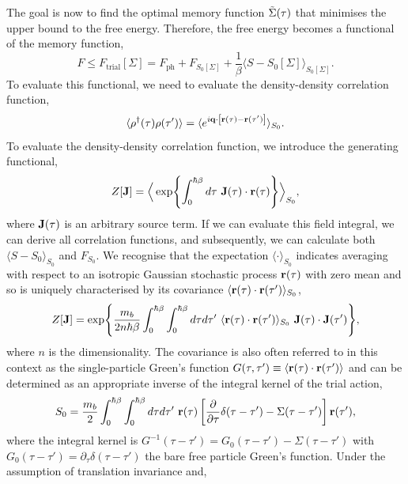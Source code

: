 The goal is now to find the optimal memory function $\Tilde{\Sigma}(\tau)$ that minimises the upper bound to the free energy. Therefore, the free energy becomes a functional of the memory function,
\begin{equation}
    F \leq F_{\text{trial}} \left[ \Sigma \right] = F_{\text{ph}} + F_{S_0[\Sigma]} + \frac{1}{\beta} \langle S - S_0[\Sigma] \rangle_{S_0[\Sigma]}.
\end{equation}
To evaluate this functional, we need to evaluate the density-density correlation function,
\begin{equation}
    \langle \rho^{\dagger}(\tau) \rho(\tau') \rangle = \langle e^{i \vb{q} \cdot \left[ \vb{r}(\tau) - \vb{r}(\tau') \right]} \rangle_{S_0} .
\end{equation}
To evaluate the density-density correlation function, we introduce the generating functional,
\begin{equation}
    Z[\vb{J}] = \Big\langle \exp{\int_0^{\hbar\beta} d\tau\ \vb{J}(\tau) \cdot \vb{r}(\tau) } \Big\rangle_{S_0},
\end{equation}
where $\vb{J}(\tau)$ is an arbitrary source term. If we can evaluate this field integral, we can derive all correlation functions, and subsequently, we can calculate both $\langle S - S_0 \rangle_{S_0}$ and $F_{S_0}$. We recognise that the expectation $\langle \cdot \rangle_{S_0}$ indicates averaging with respect to an isotropic Gaussian stochastic process $\vb{r}(\tau)$ with zero mean and so is uniquely characterised by its covariance $\langle \vb{r}(\tau) \cdot \vb{r}(\tau') \rangle_{S_0}$,
\begin{equation}
    Z[\vb{J}] = \exp{\frac{m_b}{2n \hbar \beta} \int_0^{\hbar\beta} \int_0^{\hbar\beta} d\tau d\tau'\ \langle \vb{r}(\tau) \cdot \vb{r}(\tau') \rangle_{S_0}\ \vb{J}(\tau) \cdot \vb{J}(\tau')},
\end{equation}
where $n$ is the dimensionality. The covariance is also often referred to in this context as the single-particle Green's function $G(\tau, \tau') \equiv \langle \vb{r}(\tau) \cdot \vb{r}(\tau') \rangle$ and can be determined as an appropriate inverse of the integral kernel of the trial action,
\begin{equation}
    S_0 = \frac{m_b}{2}\int_0^{\hbar\beta} \int_0^{\hbar\beta} d\tau d\tau'\ \vb{r}(\tau) \left[ \frac{\partial}{\partial \tau} \delta(\tau - \tau') - \Sigma(\tau - \tau') \right] \vb{r}(\tau'),
\end{equation}
where the integral kernel is $G^{-1}(\tau - \tau') = G_0(\tau - \tau') - \Sigma(\tau - \tau')$ with $G_0(\tau - \tau') = \partial_{\tau}\delta(\tau - \tau')$ the bare free particle Green's function. Under the assumption of translation invariance and,
